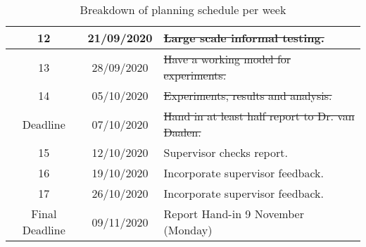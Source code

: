 \begin{table}[H]
\begin{center}
\begin{tabular}{|c|c|p{8cm}|}
      12 & 21/09/2020 & \sout{Large scale informal testing.}\\ \hline
      
      13 & 28/09/2020 & \sout{Have a working model for experiments.}\\ \hline
      
      14 & 05/10/2020 & \sout{Experiments, results and analysis.}\\ \hline
      
      Deadline & 07/10/2020 & \sout{Hand in at least half report to Dr. van Daalen.}\\ \hline
      
      15 & 12/10/2020 & Supervisor checks report.\\ \hline
      
      16 & 19/10/2020 & Incorporate supervisor feedback.\\ \hline
      
      17 & 26/10/2020 & Incorporate supervisor feedback.\\ \hline
      
      Final Deadline & 09/11/2020 &  Report Hand-in 9 November (Monday)\\ 
      
      \hline
    \end{tabular}
  \end{center}
  \caption{Breakdown of planning schedule per week}
    \label{tab:tablea1}
\end{table}